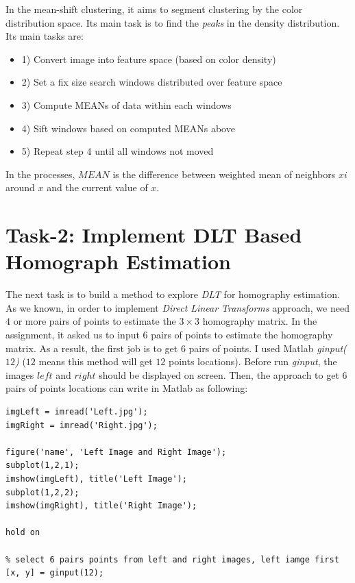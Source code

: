 \documentclass[12pt]{article}
\begin{document}
In the mean-shift clustering, it aims to segment clustering by the color distribution space. Its main task is to find the \textit{peaks} in the density distribution. Its main tasks are:

\begin{itemize}
  \item 1) Convert image into feature space (based on color density)
  \item 2) Set a fix size search windows distributed over feature space
  \item 3) Compute MEANs of data within each windows  
  \item 4) Sift windows based on computed MEANs above
  \item 5) Repeat step 4 until all windows not moved
\end{itemize}

In the processes, $MEAN$ is the difference between weighted mean of neighbors $xi$ around $x$ and the current value of $x$. 

\section{Task-2: Implement DLT Based Homograph Estimation}

The next task is to build a method to explore \textit{DLT} for homography estimation. As we known, in order to implement \textit{Direct Linear Transforms} approach, we need $4$ or more pairs of points to estimate the $3 \times 3$ homography matrix. In the assignment, it asked us to input $6$ pairs of points to estimate the homography matrix. As a result, the first job is to get $6$ pairs of points. I used Matlab \textit{ginput($12$)} ($12$ means this method will get $12$ points locations). Before run \textit{ginput}, the images $left$ and $right$ should be displayed on screen. Then, the approach to get $6$ pairs of points locations can write in Matlab as following:

\begin{lstlisting}
imgLeft = imread('Left.jpg');
imgRight = imread('Right.jpg');

figure('name', 'Left Image and Right Image');
subplot(1,2,1);
imshow(imgLeft), title('Left Image');
subplot(1,2,2);
imshow(imgRight), title('Right Image');

hold on

% select 6 pairs points from left and right images, left iamge first
[x, y] = ginput(12);
\end{lstlisting}
\end{document}
